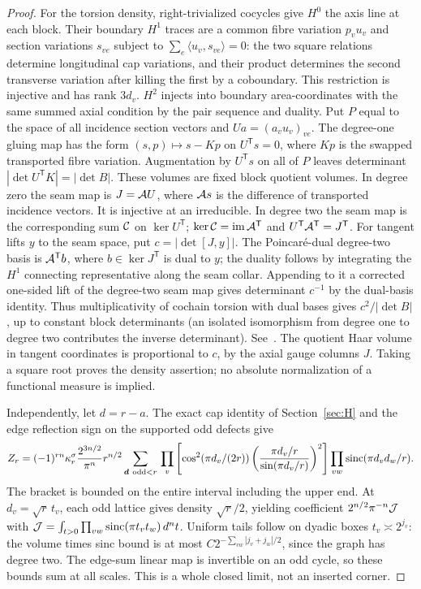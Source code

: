 \begin{proof}
For the torsion density, right-trivialized cocycles give \(H^0\) the axis line at each block. Their boundary \(H^1\) traces are a common fibre variation \(p_vu_v\) and section variations \(s_{ve}\) subject to \(\sum_e\langle u_v,s_{ve}\rangle=0\): the two square relations determine longitudinal cap variations, and their product determines the second transverse variation after killing the first by a coboundary. This restriction is injective and has rank \(3d_v\). \(H^2\) injects into boundary area-coordinates with the same summed axial condition by the pair sequence and duality. Put \(P\) equal to the space of all incidence section vectors and \(Ua=(a_vu_v)_{ve}\). The degree-one gluing map has the form \((s,p)\mapsto s-Kp\) on \(U^{\mathsf T}s=0\), where \(Kp\) is the swapped transported fibre variation. Augmentation by \(U^{\mathsf T}s\) on all of \(P\) leaves determinant \(|\det U^{\mathsf T}K|=|\det B|\). These volumes are fixed block quotient volumes. In degree zero the seam map is \(J={\cal A}U\), where \({\cal A}s\) is the difference of transported incidence vectors. It is injective at an irreducible. In degree two the seam map is the corresponding sum \({\cal C}\) on \(\ker U^{\mathsf T}\); \(\ker{\cal C}=\operatorname{im}{\cal A}^{\mathsf T}\) and \(U^{\mathsf T}{\cal A}^{\mathsf T}=J^{\mathsf T}\). For tangent lifts \(y\) to the seam space, put \(c=|\det[J,y]|\). The Poincaré-dual degree-two basis is \({\cal A}^{\mathsf T}b\), where \(b\in\ker J^{\mathsf T}\) is dual to \(y\); the duality follows by integrating the \(H^1\) connecting representative along the seam collar. Appending to it a corrected one-sided lift of the degree-two seam map gives determinant \(c^{-1}\) by the dual-basis identity. Thus multiplicativity of cochain torsion with dual bases gives \(c^2/|\det B|\), up to constant block determinants (an isolated isomorphism from degree one to degree two contributes the inverse determinant). See~\cite[Prop.\ 3.3]{Massuyeau}. The quotient Haar volume in tangent coordinates is proportional to \(c\), by the axial gauge columns \(J\). Taking a square root proves the density assertion; no absolute normalization of a functional measure is implied.

Independently, let \(d=r-a\). The exact cap identity of Section~\ref{sec:H} and the edge reflection sign on the supported odd defects give
\[
 Z_r=(-1)^{rn}\kappa_r^\sigma\frac{2^{3n/2}}{\pi^n}r^{n/2}
 \sum_{\boldsymbol d\ {\rm odd}<r}\,
  \prod_v \left[\cos^2(\pi d_v/(2r))
             \left(\frac{\pi d_v/r}{\sin(\pi d_v/r)}\right)^2\right]
  \prod_{vw}\operatorname{sinc}(\pi d_vd_w/r).
\]
The bracket is bounded on the entire interval including the upper end. At \(d_v=\sqrt r\,t_v\), each odd lattice gives density \(\sqrt r/2\), yielding coefficient \(2^{n/2}\pi^{-n}{\cal J}\) with \({\cal J}=\int_{t>0}\prod_{vw}\operatorname{sinc}(\pi t_vt_w)\,d^nt\). Uniform tails follow on dyadic boxes \(t_v\asymp2^{j_v}\): the volume times sinc bound is at most \(C2^{-\sum_{vw}|j_v+j_w|/2}\), since the graph has degree two. The edge-sum linear map is invertible on an odd cycle, so these bounds sum at all scales. This is a whole closed limit, not an inserted corner.


\end{proof}
